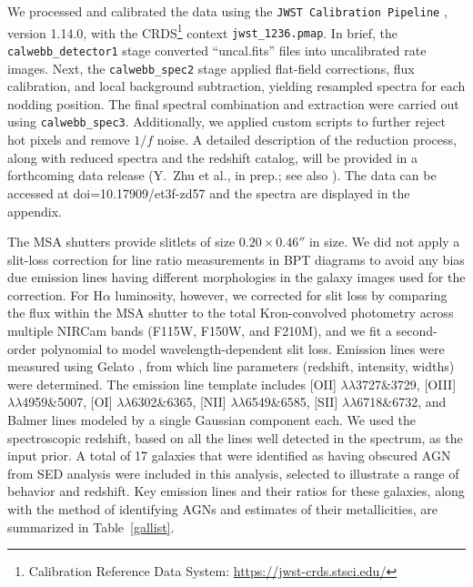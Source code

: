 \documentclass[twocolumn]{aastex63}
\begin{document}
We processed and calibrated the data using the {\tt JWST Calibration Pipeline} \citep{Bushouse2022}, version 1.14.0, with the CRDS\footnote{Calibration Reference Data System: \url{https://jwst-crds.stsci.edu/}} context {\tt jwst\_1236.pmap}. In brief, the {\tt calwebb\_detector1} stage converted ``uncal.fits'' files into uncalibrated rate images. Next, the {\tt calwebb\_spec2} stage applied flat-field corrections, flux calibration, and local background subtraction, yielding resampled spectra for each nodding position. The final spectral combination and extraction were carried out using {\tt calwebb\_spec3}. Additionally, we applied custom scripts to further reject hot pixels and remove $1/f$ noise. A detailed description of the reduction process, along with reduced spectra and the redshift catalog, will be provided in a forthcoming data release (Y.~Zhu et al., in prep.; see also \citealt{Zhu2025}). The data can be accessed at doi=10.17909/et3f-zd57 and the spectra are displayed in the appendix.

The MSA shutters provide slitlets of size $0.20 \times 0.46''$ in size. We did not apply a slit-loss correction for line ratio measurements in BPT diagrams to avoid any bias due emission lines having different morphologies in the galaxy images used for the correction. For H$\alpha$ luminosity, however, we corrected for slit loss by comparing the flux within the MSA shutter to the total Kron-convolved photometry across multiple NIRCam bands (F115W, F150W, and F210M), and we fit a second-order polynomial to model wavelength-dependent slit loss. 
Emission lines were measured using Gelato \citep{Hviding2022}, from which line parameters (redshift, intensity, widths) were determined. The emission line template includes [OII] $\lambda\lambda$3727\&3729, [OIII] $\lambda\lambda$4959\&5007, [OI] $\lambda\lambda$6302\&6365, [NII] $\lambda\lambda$6549\&6585, [SII] $\lambda\lambda$6718\&6732, and Balmer lines modeled by a single Gaussian component each. 
We used the spectroscopic redshift, based on all the lines well detected in the spectrum, as the input prior.  A total of 17 galaxies that were identified as having  obscured AGN from SED analysis \citep{Lyu2024} were included in  this analysis, selected to illustrate a range of behavior and redshift. Key emission lines and their ratios for these galaxies, along with the method of identifying AGNs and estimates of their metallicities, are summarized in Table~\ref{gallist}.
\end{document}
